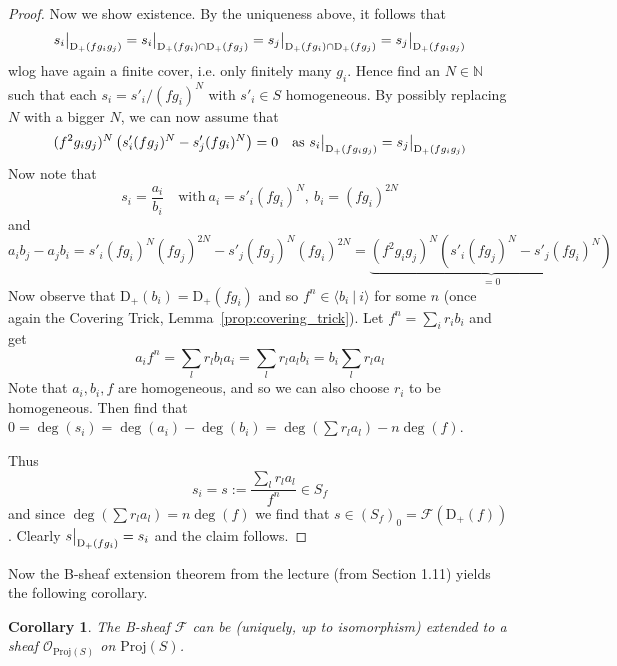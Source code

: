 \documentclass{scrartcl}
\newcommand{\N}{\mathbb{N}}
\newcommand{\D}[1]{\mathrm{D}_+(#1)}
\newcommand{\Proj}{\mathrm{Proj}}
\renewcommand{\O}{\mathcal{O}}
\newcommand\restr[2]{{
    \left.\kern-\nulldelimiterspace
    #1
    \vphantom{\big|}
    \right|_{#2}
}}
\newtheorem{corollary}[subsection]{Corollary}
\theoremstyle{definition}
\begin{document}
\begin{proof}
    Now we show existence.
    By the uniqueness above, it follows that
    \begin{equation*}
        \restr{s_i}{\D{fg_ig_j}} = \restr{s_i}{\D{fg_i} \cap \D{fg_j}} = \restr{s_j}{\D{fg_i} \cap \D{fg_j}} = \restr{s_j}{\D{fg_ig_j}}
    \end{equation*}
    wlog have again a finite cover, i.e. only finitely many $g_i$.
    Hence find an $N \in \N$ such that each $s_i = s'_i / (fg_i)^N$ with $s'_i \in S$ homogeneous.
    By possibly replacing $N$ with a bigger $N$, we can now assume that
    \begin{equation*}
        (f^2g_ig_j)^N \left( s'_i (f g_j)^N - s'_j (f g_i)^N \right) = 0 \quad \text{as $\restr{s_i}{\D{fg_ig_j}} = \restr{s_j}{\D{fg_ig_j}}$}
    \end{equation*}
    Now note that
    \begin{equation*}
        s_i = \frac {a_i} {b_i} \quad \text{with}\ a_i = s'_i(f g_i)^N, \ b_i = (f g_i)^{2N}
    \end{equation*}
    and
    \begin{equation*}
        a_i b_j - a_j b_i = s'_i (f g_i)^N (f g_j)^{2N} - s'_j (f g_j)^N (f g_i)^{2N} = \underbrace{(f^2g_ig_j)^N \left(s'_i (fg_j)^N - s'_j (fg_i)^N \right)}_{= 0}
    \end{equation*}
    Now observe that $\D{b_i} = \D{fg_i}$ and so $f^n \in \langle b_i \ | \ i \rangle$ for some $n$ (once again the Covering Trick, Lemma~\ref{prop:covering_trick}).
    Let $f^n = \sum_i r_i b_i$ and get
    \begin{equation*}
        a_i f^n = \sum_l r_l b_l a_i = \sum_l r_l a_l b_i = b_i \sum_l r_l a_l
    \end{equation*}
    Note that $a_i, b_i, f$ are homogeneous, and so we can also choose $r_i$ to be homogeneous.
    Then find that $0 = \deg(s_i) = \deg(a_i) - \deg(b_i) = \deg(\sum r_l a_l) - n\deg(f)$.

    Thus
    \begin{equation*}
        s_i = s := \frac {\sum_l r_l a_l} {f^n} \in S_f
    \end{equation*}
    and since $\deg(\sum r_l a_l) = n\deg(f)$ we find that $s \in (S_f)_0 = \mathcal{F}(\D{f})$.
    Clearly $\restr{s}{\D{fg_i}} = s_i$ and the claim follows.
\end{proof}
Now the B-sheaf extension theorem from the lecture (from Section 1.11) yields the following corollary.
\begin{corollary}
    The B-sheaf $\mathcal{F}$ can be (uniquely, up to isomorphism) extended to a sheaf $\O_{\Proj(S)}$ on $\Proj(S)$.
\end{corollary}
\end{document}
